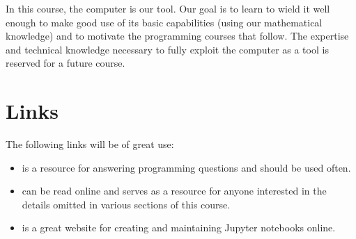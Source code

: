 \documentclass{ximera}
\begin{document}
In this course, the computer is our tool. Our goal is to learn to wield it well enough to make good use of its basic capabilities (using our mathematical knowledge) and to motivate the programming courses that follow. The expertise and technical knowledge necessary to fully exploit the computer as a tool is reserved for a future course. 

\section{Links}

The following links will be of great use:

\begin{itemize}
	\item {} is a resource for answering programming questions and should be used often.
	\item {} can be read online and serves as a resource for anyone interested in the details omitted in various sections of this course.
	\item {} is a great website for creating and maintaining Jupyter notebooks online.
\end{itemize}
\end{document}
